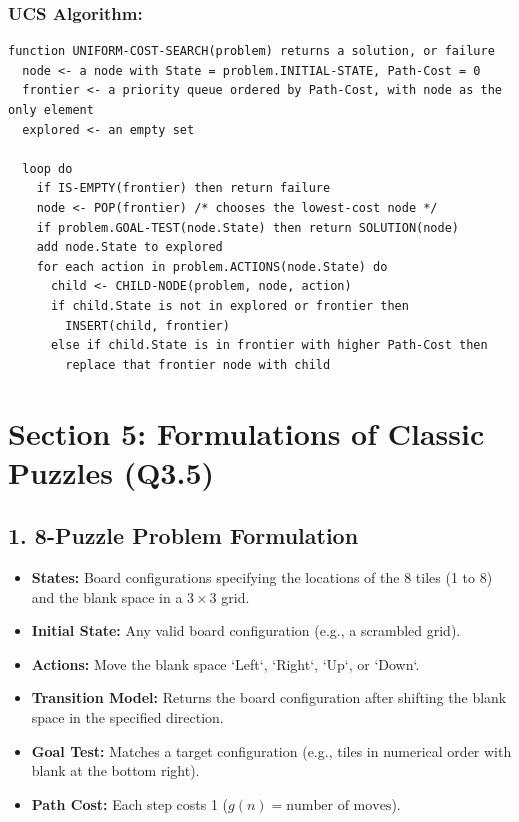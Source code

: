 \subsubsection{UCS Algorithm:}
\begin{lstlisting}
function UNIFORM-COST-SEARCH(problem) returns a solution, or failure
  node <- a node with State = problem.INITIAL-STATE, Path-Cost = 0
  frontier <- a priority queue ordered by Path-Cost, with node as the only element
  explored <- an empty set
  
  loop do
    if IS-EMPTY(frontier) then return failure
    node <- POP(frontier) /* chooses the lowest-cost node */
    if problem.GOAL-TEST(node.State) then return SOLUTION(node)
    add node.State to explored
    for each action in problem.ACTIONS(node.State) do
      child <- CHILD-NODE(problem, node, action)
      if child.State is not in explored or frontier then
        INSERT(child, frontier)
      else if child.State is in frontier with higher Path-Cost then
        replace that frontier node with child
\end{lstlisting}


\section{Section 5: Formulations of Classic Puzzles (Q3.5)}

\subsection{1. 8-Puzzle Problem Formulation}

\begin{itemize}
  \item   \textbf{States:} Board configurations specifying the locations of the 8 tiles (1 to 8) and the blank space in a $3\times3$ grid.
  \item   \textbf{Initial State:} Any valid board configuration (e.g., a scrambled grid).
  \item   \textbf{Actions:} Move the blank space `Left`, `Right`, `Up`, or `Down`.
  \item   \textbf{Transition Model:} Returns the board configuration after shifting the blank space in the specified direction.
  \item   \textbf{Goal Test:} Matches a target configuration (e.g., tiles in numerical order with blank at the bottom right).
  \item   \textbf{Path Cost:} Each step costs 1 ($g(n) = \text{number of moves}$).
\end{itemize}

